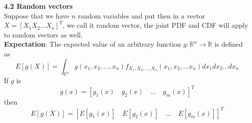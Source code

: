 \documentclass[10pt,a4paper,oneside]{beamer}
\begin{document}
\begin{frame}
\vspace{0.3cm}
{\bfseries 4.2 Random vectors}
\vspace{0.5cm}
\\Suppose that we have $n$ random variables and put then in a vector $X=[X_1 X_2...X_n]^T$, we call it random vector, the joint PDF and CDF will apply to random vectors as well.
\vspace{0.5cm}
\\{\bfseries Expectation}: The expected value of an arbitrary function $g:\mathbb{R}^n\rightarrow\mathbb{R}$ is defined as
\[
E[g(X)]=\int_{\mathbb{R}^{n}} g\left(x_{1}, x_{2}, \ldots, x_{n}\right) f_{X_{1}, X_{2}, \ldots, X_{n}}\left(x_{1}, x_{2}, \ldots x_{n}\right) d x_{1} d x_{2} \dots d x_{n}
\]
If $g$ is
\[
g(x)=[g_1(x) \quad g_2(x)  \quad... \quad g_m(x)]^T
\]
then
\[
E[g(X)]=[E[g_1(x)] \quad E[g_2(x)]  \quad... \quad E[g_m(x)]]^T
\]
\end{frame}
\end{document}
